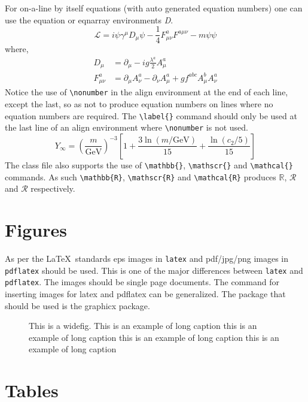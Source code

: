 \documentclass[journal=gmj]{CUP-JNL-DTM}%
\theoremstyle{definition}
\numberwithin{equation}{section}
\begin{document}
For on-a-line by itself equations (with auto generated equation numbers)
one can use the equation or eqnarray environments \textit{D}.
\begin{equation}
\mathcal{L} = i {\psi} \gamma^\mu D_\mu \psi
    - \frac{1}{4} F_{\mu\nu}^a F^{a\mu\nu} - m {\psi} \psi
\label{eq1}
\end{equation}
where,
\begin{align}
D_\mu &=  \partial_\mu - ig \frac{\lambda^a}{2} A^a_\mu
\nonumber \\
F^a_{\mu\nu} &= \partial_\mu A^a_\nu - \partial_\nu A^a_\mu
    + g f^{abc} A^b_\mu A^a_\nu
\label{eq2}
\end{align}
Notice the use of \verb+\nonumber+ in the align environment at the end
of each line, except the last, so as not to produce equation numbers on
lines where no equation numbers are required. The \verb+\label{}+ command
should only be used at the last line of an align environment where
\verb+\nonumber+ is not used.
\begin{equation}
Y_\infty = \left( \frac{m}{\textrm{GeV}} \right)^{-3}
    \left[ 1 + \frac{3 \ln(m/\textrm{GeV})}{15}
    + \frac{\ln(c_2/5)}{15} \right]
\end{equation}
The class file also supports the use of \verb+\mathbb{}+, \verb+\mathscr{}+ and
\verb+\mathcal{}+ commands. As such \verb+\mathbb{R}+, \verb+\mathscr{R}+
and \verb+\mathcal{R}+ produces $\mathbb{R}$, $\mathscr{R}$ and $\mathcal{R}$
respectively.

\section{Figures}

As per the \LaTeX\ standards eps images in \verb!latex! and pdf/jpg/png images in
\verb!pdflatex! should be used. This is one of the major differences between \verb!latex!
and \verb!pdflatex!. The images should be single page documents. The command for inserting images
for latex and pdflatex can be generalized. The package that should be used
is the graphicx package.

\begin{figure}[t]%
{\caption{This is a widefig. This is an example of long caption this is an example of long caption  this is an example of long caption this is an example of long caption}
\label{fig1}}
\end{figure}



\section{Tables}
\end{document}
